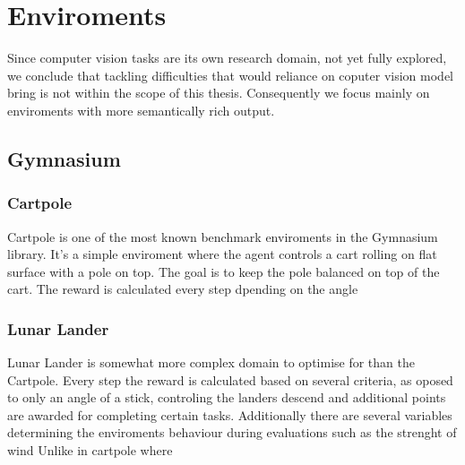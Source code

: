 \chapter{Enviroments}
 
Since computer vision tasks are its own research domain, not yet fully explored, we conclude that tackling 
difficulties that would reliance on coputer vision model bring is not within the scope of this thesis. 
Consequently we focus mainly on enviroments with more semantically rich output.
\section{Gymnasium}

\subsection{Cartpole}
Cartpole is one of the most known benchmark enviroments in the Gymnasium library. It's a simple enviroment where the agent controls a cart rolling on flat surface with a pole on top.
The goal is to keep the pole balanced on top of the cart. The reward is calculated every step dpending on the angle 
\subsection{Lunar Lander}
Lunar Lander is somewhat more complex domain to optimise for than the Cartpole.  
Every step the reward is calculated based on several criteria, as oposed to only an angle of a stick, controling the landers descend and additional points are awarded for completing certain tasks.
Additionally there are several variables determining the enviroments behaviour during evaluations such as the strenght of wind Unlike in cartpole where  